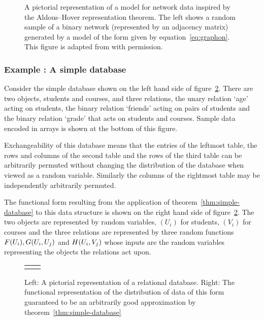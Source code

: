 \begin{figure}[ht]
\centering
\begin{tabular}{c}

\end{tabular}
\caption{
A pictorial representation of a model for network data inspired by the Aldous--Hover representation theorem.
The left shows a random sample of a binary network (represented by an adjacency matrix) generated by a model of the form given by equation~\eqref{eq:graphon}.
This figure is adapted from \cite{Lloyd2012} with permission.}
\label{fig:graphon}
\end{figure}

%
\subsubsection{Example : A simple database}

Consider the simple database shown on the left hand side of figure~\ref{fig:multi-rel-seq}.
There are two objects, students and courses, and three relations, the unary relation `age' acting on students, the binary relation `friends' acting on pairs of students and the binary relation `grade' that acts on students and courses.
Sample data encoded in arrays is shown at the bottom of this figure.

Exchangeability of this database means that the entries of the leftmost table, the rows and columns of the second table and the rows of the third table can be arbitrarily permuted without changing the distribution of the database when viewed as a random variable.
Similarly the columns of the rightmost table may be independently arbitrarily permuted.

The functional form resulting from the application of theorem~\ref{thm:simple-database} to this data structure is shown on the right hand side of figure~\ref{fig:multi-rel-seq}.
The two objects are represented by \iid random variables, $(U_i)$ for students, $(V_i)$ for courses and the three relations are represented by three random functions $F(U_i),G(U_i,U_j)$ and $H(U_i,V_j)$ whose inputs are the random variables representing the objects the relations act upon.

\begin{figure}[ht]
\centering
\begin{tabular}{cc}
\tiny  & \tiny 
\end{tabular}
\caption{Left: A pictorial representation of a relational database. Right: The functional representation of the distribution of data of this form guaranteed to be an arbitrarily good approximation by theorem~\ref{thm:simple-database}}
\label{fig:multi-rel-seq}
\end{figure}

